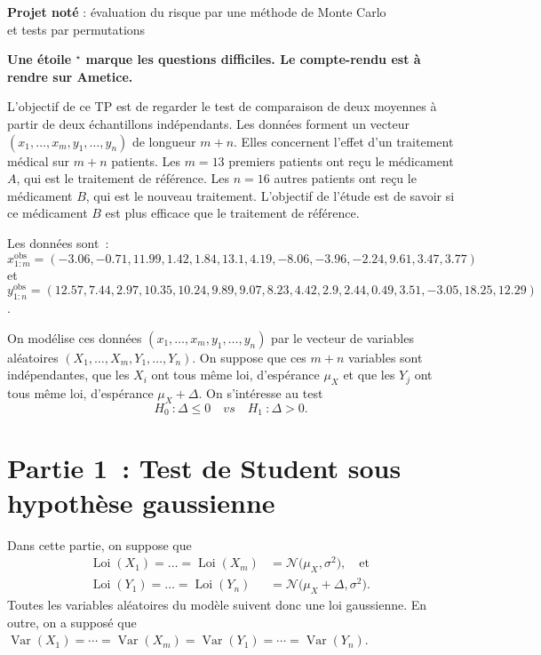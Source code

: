 \documentclass[a4paper,12pt,twosided]{article}
\newcommand{\var}{\operatorname{Var}}
\newcommand{\loi}{\operatorname{Loi}}
\theoremstyle{definition}
\begin{document}
\pagestyle{fancy}

\begin{center}
  {\Large\textbf{Projet noté} : évaluation du risque par une méthode de Monte Carlo\\
    et tests par permutations}%
\end{center}
\textbf{Une étoile $^\star$ marque les questions difficiles. Le compte-rendu est à rendre sur
  Ametice.}


L'objectif de ce TP est de regarder le test de comparaison de deux moyennes à partir de deux
échantillons indépendants.
Les données forment un vecteur $(x_1,\ldots, x_m, y_1,\ldots, y_n)$ de longueur $m+n$. Elles
concernent l'effet d'un traitement médical sur $m+n$ patients. Les $m=13$ premiers patients ont reçu
le médicament $A$, qui est le traitement de référence. Les $n=16$ autres patients ont reçu le
médicament $B$, qui est le nouveau traitement. L'objectif de l'étude est de savoir si ce médicament
$B$ est plus efficace que le traitement de référence.

Les données sont~:\\
$x_{1:m}^\text{obs} = (-3.06, -0.71, 11.99, 1.42, 1.84, 13.1, 4.19, -8.06, -3.96, -2.24, 9.61, 3.47, 3.77)$ et\\
$y_{1:n}^\text{obs} = (12.57, 7.44, 2.97, 10.35, 10.24, 9.89, 9.07, 8.23, 4.42, 2.9, 2.44, 0.49, 3.51, -3.05, 18.25, 12.29)$.

On modélise ces données $(x_1,\ldots, x_m, y_1,\ldots, y_n)$ par le vecteur de variables aléatoires
$(X_1,\ldots, X_m, Y_1,\ldots, Y_n)$. On suppose que ces $m+n$ variables sont indépendantes, que les
$X_i$ ont tous même loi, d'espérance $\mu_X$ et que les $Y_j$ ont tous même loi, d'espérance
$\mu_X+\Delta$. On s'intéresse au test 
\[
  H_0~: \Delta \le 0 \quad \textit{vs} \quad H_1~: \Delta>0.
\]


\section*{Partie 1~: Test de Student sous hypothèse gaussienne}

Dans cette partie, on suppose que
\begin{align}
  \label{eq:loi1}
  \loi(X_1) = \ldots = \loi(X_m) &= \mathscr N\Big(\mu_X, \sigma^2\Big), \quad \text{et} \
  \\
  \label{eq:loi2}
  \loi(Y_1) = \ldots = \loi(Y_n) &= \mathscr N\Big(\mu_X+\Delta, \sigma^2\Big).
\end{align}
Toutes les variables aléatoires du modèle suivent donc une loi gaussienne. En outre, on a supposé
que $\var(X_1)=\cdots = \var(X_m)=\var(Y_1)=\cdots=\var(Y_n)$.
\end{document}
